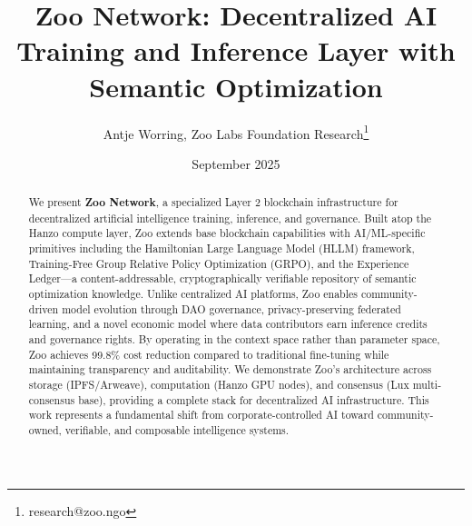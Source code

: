 \documentclass[11pt,a4paper]{article}
\title{\textbf{Zoo Network: Decentralized AI Training and Inference Layer with Semantic Optimization}}
\author[1]{Antje Worring, Zoo Labs Foundation Research\thanks{research@zoo.ngo}}
\affil[1]{\textit{Hanzo Industries \quad Lux Industries \quad Zoo Labs Foundation}, \texttt{research@zoo.ngo}}
\date{September 2025}
\begin{document}
\zoocoverpage

\begin{abstract}
We present \textbf{Zoo Network}, a specialized Layer 2 blockchain infrastructure for decentralized artificial intelligence training, inference, and governance. Built atop the Hanzo compute layer, Zoo extends base blockchain capabilities with AI/ML-specific primitives including the Hamiltonian Large Language Model (HLLM) framework, Training-Free Group Relative Policy Optimization (GRPO), and the Experience Ledger—a content-addressable, cryptographically verifiable repository of semantic optimization knowledge. Unlike centralized AI platforms, Zoo enables community-driven model evolution through DAO governance, privacy-preserving federated learning, and a novel economic model where data contributors earn inference credits and governance rights. By operating in the context space rather than parameter space, Zoo achieves 99.8\% cost reduction compared to traditional fine-tuning while maintaining transparency and auditability. We demonstrate Zoo's architecture across storage (IPFS/Arweave), computation (Hanzo GPU nodes), and consensus (Lux multi-consensus base), providing a complete stack for decentralized AI infrastructure. This work represents a fundamental shift from corporate-controlled AI toward community-owned, verifiable, and composable intelligence systems.
\end{abstract}



















\end{document}

